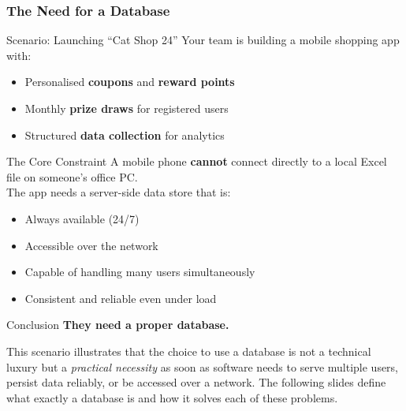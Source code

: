 \begin{frame}
  \frametitle{The Need for a Database}

  \begin{examples}{Scenario: Launching ``Cat Shop 24''}
    Your team is building a mobile shopping app with:
    \begin{itemize}
      \item Personalised \textbf{coupons} and \textbf{reward points}
      \item Monthly \textbf{prize draws} for registered users
      \item Structured \textbf{data collection} for analytics
    \end{itemize}
  \end{examples}

  \vspace{0.5em}
  \begin{alertblock}{The Core Constraint}
    A mobile phone \textbf{cannot} connect directly to a local Excel file on someone's office PC.\\
    The app needs a server-side data store that is:
    \begin{itemize}
      \item Always available (24/7)
      \item Accessible over the network
      \item Capable of handling many users simultaneously
      \item Consistent and reliable even under load
    \end{itemize}
  \end{alertblock}

  \begin{block}{Conclusion}
    \centering
    \large\textbf{They need a proper database.}
  \end{block}

  This scenario illustrates that the choice to use a database is not a technical luxury but a \emph{practical necessity} as soon as software needs to serve multiple users, persist data reliably, or be accessed over a network. The following slides define what exactly a database is and how it solves each of these problems.
\end{frame}

